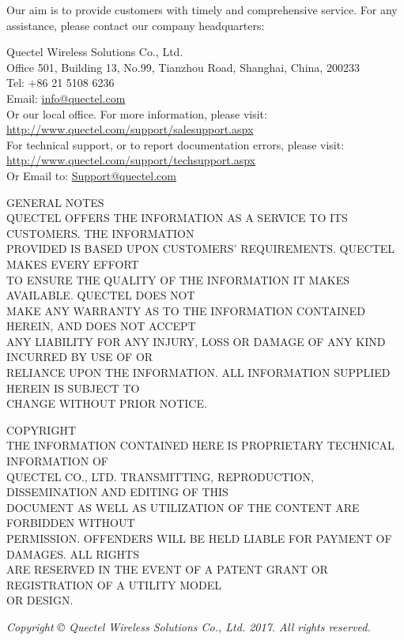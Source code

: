 \vspace*{1.6cm}
\noindent
{\xiaosibf
Our aim is to provide customers with timely and comprehensive service. For any\\
assistance, please contact our company headquarters:}

\vspace{\baselineskip}
\noindent
{\xiaosibf
Quectel Wireless Solutions Co., Ltd.}\\
Office 501, Building 13, No.99, Tianzhou Road, Shanghai, China, 200233\\
Tel: +86 21 5108 6236\\
Email: \underline{info@quectel.com}\\

\vspace{\baselineskip}
\noindent
{\xiaosibf
Or our local office. For more information, please visit:}\\
\underline{http://www.quectel.com/support/salesupport.aspx}\\

\vspace{\baselineskip}
\noindent
{\xiaosibf
For technical support, or to report documentation errors, please visit:}\\
\underline{http://www.quectel.com/support/techsupport.aspx}\\
Or Email to: \underline{Support@quectel.com}

\vspace{\baselineskip}
\noindent
{\xiaosibf
GENERAL NOTES}\\
QUECTEL OFFERS THE INFORMATION AS A SERVICE TO ITS CUSTOMERS. THE INFORMATION\\
PROVIDED IS BASED UPON CUSTOMERS’ REQUIREMENTS. QUECTEL MAKES EVERY EFFORT\\
TO ENSURE THE QUALITY OF THE INFORMATION IT MAKES AVAILABLE. QUECTEL DOES NOT\\
MAKE ANY WARRANTY AS TO THE INFORMATION CONTAINED HEREIN, AND DOES NOT ACCEPT\\
ANY LIABILITY FOR ANY INJURY, LOSS OR DAMAGE OF ANY KIND INCURRED BY USE OF OR\\
RELIANCE UPON THE INFORMATION. ALL INFORMATION SUPPLIED HEREIN IS SUBJECT TO\\
CHANGE WITHOUT PRIOR NOTICE.

\vspace{\baselineskip}
\noindent
{\xiaosibf
COPYRIGHT}\\
THE INFORMATION CONTAINED HERE IS PROPRIETARY TECHNICAL INFORMATION OF\\
QUECTEL CO., LTD. TRANSMITTING, REPRODUCTION, DISSEMINATION AND EDITING OF THIS\\
DOCUMENT AS WELL AS UTILIZATION OF THE CONTENT ARE FORBIDDEN WITHOUT\\
PERMISSION. OFFENDERS WILL BE HELD LIABLE FOR PAYMENT OF DAMAGES. ALL RIGHTS\\
ARE RESERVED IN THE EVENT OF A PATENT GRANT OR REGISTRATION OF A UTILITY MODEL\\
OR DESIGN.

\vspace{\baselineskip}
\vspace{\baselineskip}
\noindent
{\xiaosibf
\emph{Copyright © Quectel Wireless Solutions Co., Ltd. 2017. All rights reserved.}}
\clearpage
